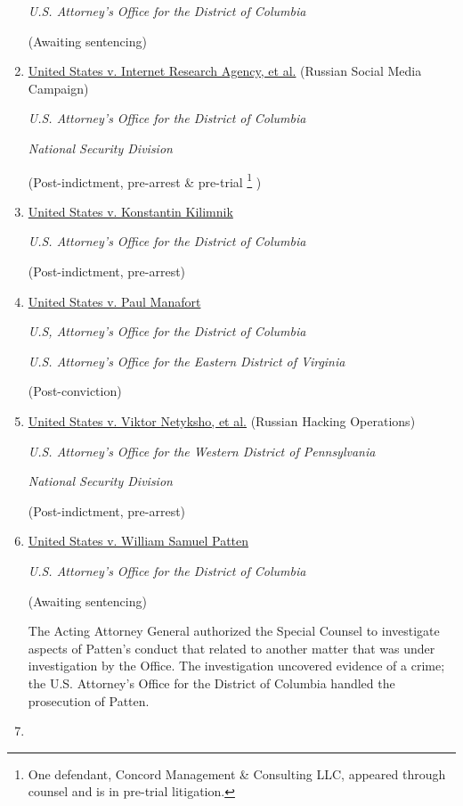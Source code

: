 \begin{enumerate}[1.]
\textit{U.S. Attorney's Office for the District of Columbia}

(Awaiting sentencing)

    \item \underline{United States v. Internet Research Agency, et al.} (Russian Social Media Campaign)

\textit{U.S. Attorney’s Office for the District of Columbia}

\textit{National Security Division}

(Post-indictment, pre-arrest \& pre-trial%
\footnote{One defendant, Concord Management \& Consulting LLC, appeared through counsel and is in pre-trial litigation.}
)

    \item \underline{United States v. Konstantin Kilimnik}

\textit{U.S. Attorney’s Office for the District of Columbia}

(Post-indictment, pre-arrest)

    \item \underline{United States v. Paul Manafort}

\textit{U.S, Attorney's Office for the District of Columbia}

\textit{U.S. Attorney’s Office for the Eastern District of Virginia}

(Post-conviction)

    \item \underline{United States v. Viktor Netyksho, et al.} (Russian Hacking Operations)

\textit{U.S. Attorney’s Office for the Western District of Pennsylvania}

\textit{National Security Division}

(Post-indictment, pre-arrest)

    \item \underline{United States v. William Samuel Patten}

\textit{U.S. Attorney's Office for the District of Columbia}

(Awaiting sentencing)

The Acting Attorney General authorized the Special Counsel to investigate aspects of Patten’s conduct that related to another matter that was under investigation by the Office.
The investigation uncovered evidence of a crime; the U.S. Attorney’s Office for the District of Columbia handled the prosecution of Patten.

    \item \underline{}


\end{enumerate}
